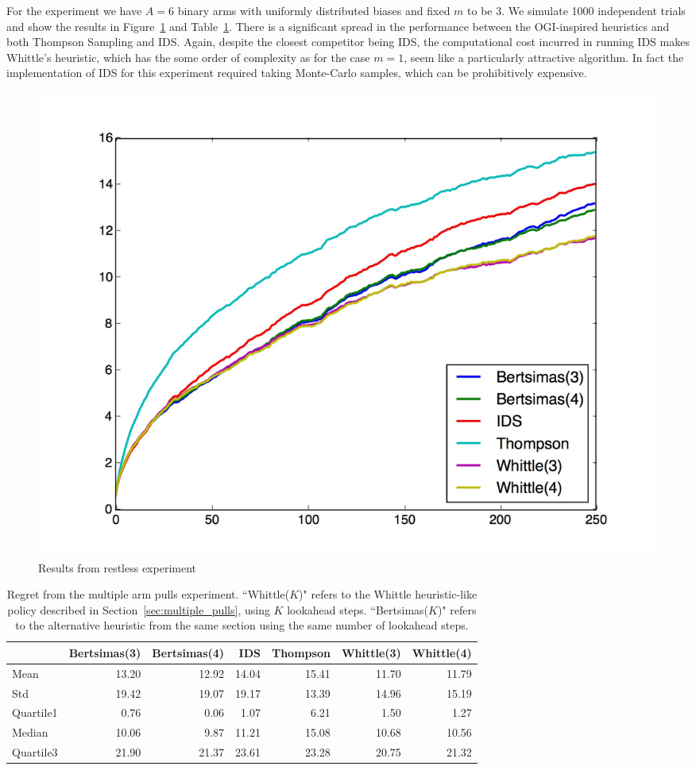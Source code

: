 For the experiment we have $A = 6$ binary arms with uniformly  distributed biases and fixed $m$ to be 3. We simulate 1000 independent trials and show the results in Figure~\ref{fig:restless1} and Table~\ref{table:restless1_summary}. There is a significant spread in the performance between the OGI-inspired heuristics and both Thompson Sampling and IDS. Again, despite the closest competitor being IDS, the computational cost incurred in running IDS makes Whittle's heuristic, which has the some order of complexity as for the case $m=1$, seem like a particularly attractive algorithm. In fact the implementation of IDS for this experiment required taking Monte-Carlo samples, which can be prohibitively expensive.
\begin{figure}
	\centering
	\includegraphics[width=0.5\linewidth]{plots/restless1}
	\caption{Results from restless experiment}
	\label{fig:restless1}
\end{figure}

\begin{table}
	\centering
	\begin{tabular}{lrrrrrr}
		\toprule
		{} &  Bertsimas(3) &  Bertsimas(4) &   IDS &  Thompson &  Whittle(3) &  Whittle(4) \\
		\midrule
		Mean      &         13.20 &         12.92 & 14.04 &     15.41 &       11.70 &       11.79 \\
		Std       &         19.42 &         19.07 & 19.17 &     13.39 &       14.96 &       15.19 \\
		Quartile1 &          0.76 &          0.06 &  1.07 &      6.21 &        1.50 &        1.27 \\
		Median    &         10.06 &          9.87 & 11.21 &     15.08 &       10.68 &       10.56 \\
		Quartile3 &         21.90 &         21.37 & 23.61 &     23.28 &       20.75 &       21.32 \\
		\bottomrule
	\end{tabular}
	\caption{Regret from the multiple arm pulls experiment. ``Whittle($K$)" refers to the Whittle heuristic-like policy described in Section~\ref{sec:multiple_pulls}, using $K$ lookahead steps. ``Bertsimas($K$)" refers to the alternative heuristic from the same section using the same number of lookahead steps.}
	\label{table:restless1_summary}
\end{table}